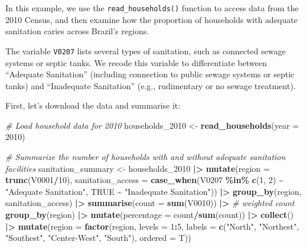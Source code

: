 \documentclass[
]{article}
\newenvironment{Shaded}{\begin{snugshade}}{\end{snugshade}}
\newcommand{\AttributeTok}[1]{\textcolor[rgb]{0.13,0.29,0.53}{#1}}
\newcommand{\CommentTok}[1]{\textcolor[rgb]{0.56,0.35,0.01}{\textit{#1}}}
\newcommand{\ConstantTok}[1]{\textcolor[rgb]{0.56,0.35,0.01}{#1}}
\newcommand{\DecValTok}[1]{\textcolor[rgb]{0.00,0.00,0.81}{#1}}
\newcommand{\FunctionTok}[1]{\textcolor[rgb]{0.13,0.29,0.53}{\textbf{#1}}}
\newcommand{\NormalTok}[1]{#1}
\newcommand{\OtherTok}[1]{\textcolor[rgb]{0.56,0.35,0.01}{#1}}
\newcommand{\SpecialCharTok}[1]{\textcolor[rgb]{0.81,0.36,0.00}{\textbf{#1}}}
\newcommand{\StringTok}[1]{\textcolor[rgb]{0.31,0.60,0.02}{#1}}
\begin{document}
In this example, we use the \texttt{read\_households()} function to
access data from the 2010 Census, and then examine how the proportion of
households with adequate sanitation caries across Brazil's regions.

The variable \texttt{V0207} lists several types of sanitation, such as
connected sewage systems or septic tanks. We recode this variable to
differentiate between ``Adequate Sanitation'' (including connection to
public sewage systems or septic tanks) and ``Inadequate Sanitation''
(e.g., rudimentary or no sewage treatment).

First, let's download the data and summarise it:

\begin{Shaded}
\begin{Highlighting}[]
\CommentTok{\# Load household data for 2010}
\NormalTok{households\_2010 }\OtherTok{\textless{}{-}} \FunctionTok{read\_households}\NormalTok{(}\AttributeTok{year =} \DecValTok{2010}\NormalTok{)}

\CommentTok{\# Summarize the number of households with and without adequate sanitation facilities}
\NormalTok{sanitation\_summary }\OtherTok{\textless{}{-}}\NormalTok{ households\_2010 }\SpecialCharTok{|\textgreater{}}
        \FunctionTok{mutate}\NormalTok{(}\AttributeTok{region =} \FunctionTok{trunc}\NormalTok{(V0001}\SpecialCharTok{/}\DecValTok{10}\NormalTok{),}
               \AttributeTok{sanitation\_access =} \FunctionTok{case\_when}\NormalTok{(V0207 }\SpecialCharTok{\%in\%} \FunctionTok{c}\NormalTok{(}\DecValTok{1}\NormalTok{, }\DecValTok{2}\NormalTok{) }\SpecialCharTok{\textasciitilde{}} \StringTok{"Adequate Sanitation"}\NormalTok{,}
                                             \ConstantTok{TRUE} \SpecialCharTok{\textasciitilde{}} \StringTok{"Inadequate Sanitation"}\NormalTok{)) }\SpecialCharTok{|\textgreater{}}
        \FunctionTok{group\_by}\NormalTok{(region, sanitation\_access) }\SpecialCharTok{|\textgreater{}}
        \FunctionTok{summarise}\NormalTok{(}\AttributeTok{count =} \FunctionTok{sum}\NormalTok{(V0010)) }\SpecialCharTok{|\textgreater{}} \CommentTok{\# weighted count}
        \FunctionTok{group\_by}\NormalTok{(region) }\SpecialCharTok{|\textgreater{}}
        \FunctionTok{mutate}\NormalTok{(}\AttributeTok{percentage =}\NormalTok{ count}\SpecialCharTok{/}\FunctionTok{sum}\NormalTok{(count)) }\SpecialCharTok{|\textgreater{}}
        \FunctionTok{collect}\NormalTok{() }\SpecialCharTok{|\textgreater{}}
        \FunctionTok{mutate}\NormalTok{(}\AttributeTok{region =} \FunctionTok{factor}\NormalTok{(region,}
                               \AttributeTok{levels =} \DecValTok{1}\SpecialCharTok{:}\DecValTok{5}\NormalTok{,}
                               \AttributeTok{labels =} \FunctionTok{c}\NormalTok{(}\StringTok{"North"}\NormalTok{, }\StringTok{"Northest"}\NormalTok{, }\StringTok{"Southest"}\NormalTok{, }\StringTok{"Center{-}West"}\NormalTok{, }\StringTok{"South"}\NormalTok{),}
                               \AttributeTok{ordered =}\NormalTok{ T))}
\end{Highlighting}
\end{Shaded}
\end{document}
